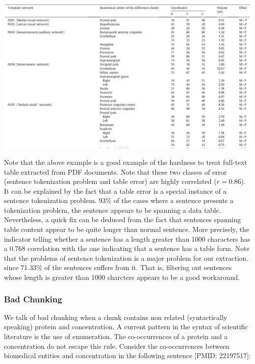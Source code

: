 \begin{center}
\includegraphics[width=\textwidth]{fig/bad_sent_tok_2.png}
\end{center}
Note that the above example is a good example of the hardness to treat full-text table extracted from PDF documents.
Note that these two classes of error (sentence tokenization problem and table error) are highly correlated ($r = 0.86$). It can be explained by the fact that a table error is a special instance of a sentence tokenization problem. 93\% of the cases where a sentence presents a tokenization problem, the sentence appears to be spanning a data table.
Nevertheless, a quick fix can be deduced from the fact that sentences spanning table content appear to be quite longer than normal sentence. More precisely, the indicator telling whether a
sentence has a length greater than 1000 characters has a 0.768 correlation with the one indicating that a sentence has a table form.
Note that the problems of sentence tokenization is a major problem for our 
extraction. since 71.33\% of the sentences suffers from it. That is, filtering out 
sentences whose length is greater than 1000 charcters appears to be a good 
workaround.

\subsubsection{Bad Chunking}
We talk of bad chunking when a chunk contains non related (syntactically speaking) protein and concentration.
A current pattern in the syntax of scientific literature is the use of enumeration. The co-occurrences of a protein and a concentration 
do not escape this rule. Consider the co-occurrences between biomedical entities and concentration in the following sentence [PMID: 22197517]:

